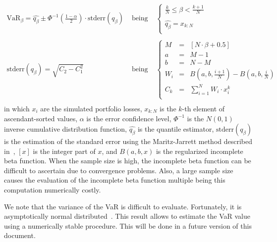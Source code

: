 \documentclass[11pt,fleqn]{book} %
\begin{document}
\begin{displaymath}
	\begin{array}{lcl}
		\textrm{VaR}_{\beta} = \widehat{q_{\beta}} \pm \Phi^{-1}\left(\frac{1-\alpha}{2}\right) \cdot \textrm{stderr}(q_{\beta})
		& \text{ being } &
		\left\{
		\begin{array}{l}
			\displaystyle
			\frac{k}{N} \leq \beta < \frac{k+1}{N} \\
			\\
			\displaystyle
			\widehat{q_{\beta}} = x_{k:N} \\
		\end{array}
		\right.
		\\
		& &
		\\
		\textrm{stderr}(q_{\beta}) = \sqrt{C_2 - C_1^2}
		& \text{ being } &
		\left\{
		\begin{array}{rcl}
			M   & = & [N \cdot \beta + 0.5]  \\
			a   & = & M - 1            \\
			b   & = & N - M            \\
			W_i & = & B(a,b,\frac{i+1}{N}) - B(a,b,\frac{i}{N}) \\
			C_k & = & \sum_{i=1}^{N} W_i \cdot x_i^k \\
		\end{array}
		\right.
		\\
	\end{array}
\end{displaymath}
in which $x_i$ are the simulated portfolio losses, $x_{k:N}$ is the $k$-th 
element of ascendant-sorted values, $\alpha$ is the error confidence level, 
$\Phi^{-1}$ is the $N(0,1)$ inverse cumulative distribution function, 
$\widehat{q_{\beta}}$ is the quantile estimator, $\textrm{stderr}(q_{\beta})$ 
is the estimation of the standard error using the Maritz-Jarrett method 
described in~\cite[chap. 3.5.3]{wilcox:2004}, $[x]$ is the integer part of 
$x$, and $B(a,b,x)$ is the regularized incomplete beta function.
When the sample size is high, the incomplete beta function can be difficult 
to ascertain due to convergence problems. Also, a large sample size causes 
the evaluation of the incomplete beta function multiple being this computation
numerically costly.

We note that the variance of the VaR is difficult to evaluate. Fortunately, 
it is asymptotically normal distributed~\cite{brereton:2012}. This result 
allows to estimate the VaR value using a numerically stable procedure. This 
will be done in a future version of this document.
\end{document}
